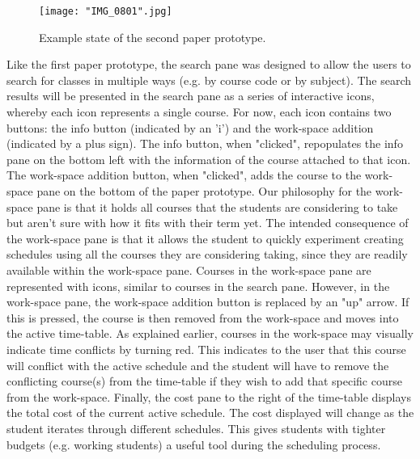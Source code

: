 \documentclass{article}
\begin{document}
\begin{figure}[h]
    \centering
    \caption{Example state of the second paper prototype.}
    \texttt{[image: "IMG\_0801".jpg]}
    \label{fig:my_label}
\end{figure}
\noindent
Like the first paper prototype, the search pane was designed to allow the users to search for classes in multiple ways (e.g. by course code or by subject). The search results will be presented in the search pane as a series of interactive icons, whereby each icon represents a single course. For now, each icon contains two buttons: the info button (indicated by an 'i') and the work-space addition (indicated by a plus sign). The info button, when "clicked", repopulates the info pane on the bottom left with the information of the course attached to that icon. The work-space addition button, when "clicked", adds the course to the work-space pane on the bottom of the paper prototype. Our philosophy for the work-space pane is that it holds all courses that the students are considering to take but aren't sure with how it fits with their term yet. The intended consequence of the work-space pane is that it allows the student to quickly experiment creating schedules using all the courses they are considering taking, since they are readily available within the work-space pane.
\newline
\newline
Courses in the work-space pane are represented with icons, similar to courses in the search pane. However, in the work-space pane, the work-space addition button is replaced by an "up" arrow. If this is pressed, the course is then removed from the work-space and moves into the active time-table. As explained earlier, courses in the work-space may visually indicate time conflicts by turning red. This indicates to the user that this course will conflict with the active schedule and the student will have to remove the conflicting course(s) from the time-table if they wish to add that specific course from the work-space. Finally, the cost pane to the right of the time-table displays the total cost of the current active schedule. The cost displayed will change as the student iterates through different schedules. This gives students with tighter budgets (e.g. working students) a useful tool during the scheduling process.
\end{document}
